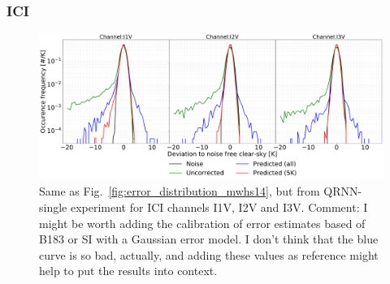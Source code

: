 \documentclass[amt, manuscript]{copernicus}
\newcommand{\todo}[1]{{\color{red} #1}}
\begin{document}
\subsubsection{ICI}
%
\begin{figure}[t]
	\includegraphics[width=\textwidth]{Figures/error_distribution_QRNN-single.pdf} 
	\caption{Same as Fig.~\ref{fig:error_distribution_mwhs14}, but from QRNN-single experiment for ICI channels I1V, I2V and I3V.
    \todo{Comment: I might be worth adding  the calibration of error estimates based of B183 or SI with
      a Gaussian error model. I don't think that the blue curve is so bad, actually, and adding these
    values as reference might help to put the results into context.}}
	\label{fig:error_distributions}	
\end{figure}
\end{document}
